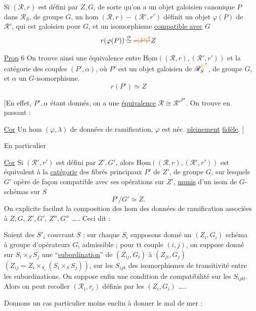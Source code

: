 Si $(\mathscr R,r)$ est défini par $Z,G$, de sorte qu'on a un objet galoisien canonique $P$ dans $\mathscr R_S$, de groupe $G$, un  hom $(\mathscr R,r)-(\mathscr R',r')$ définit un objet $\varphi(P)$ de $\mathscr R'$, qui est galoisien  pour $G$, et un isomorphisme \uline{compatible avec} $G$
\[
r(\varphi(P))\overset{\alpha}{\simeq}\deleted{\unsure{r(P)}} Z
\]

\uline{Prop} 6 On trouve ainsi une équivalence entre $\underline{\mathrm{Hom}}((\mathscr R,r),(\mathscr R',r'))$ et la catégorie des couples $(P',\alpha)$, où $P'$ est un objet galoisien de $\mathscr R^{\unsure{\prime|\,}}_S$, de groupe $G$, et $\alpha$ un $G$-isomorphisme.
\[
r(P')\simeq Z
\]

[En effet, $P',\alpha$ étant donnés, on a une \uline{équivalence} $\mathscr R\cong{\mathscr R'}^{P'}$. On trouve en passant  :

\uline{Cor}  Un hom $(\varphi,\lambda)$ de données de ramification,  $\varphi$ est néc. \uline{pleinement} \uline{fidèle}. ]

En particulier

\uline{Cor}  Si $(\mathscr R',r')$ est défini par $Z',G'$, alors $\underline{\mathrm{Hom}}((\mathscr R,r),(\mathscr R',r'))$ est équivalent à la \uline{catégorie} des fibrés principaux $P'$ de $Z'$, de groupe $G$, sur lesquels $G'$ opère  de façon compatible avec ses opérations sur $Z'$, \uline{munis} d'un isom de $G$-schémas sur $S$
\[
P'/G'\simeq Z.
\]
On explicite facilmt la composition des hom des données de ramification associées à $Z,G$, $Z',G'$, $Z'',G''$ \ldots.. Ceci dit :

Soient des $S'_i$ couvrant $S$ ; sur chaque $S_i$ supposons donné un $(Z_i,G_i)$ schéma à groupe d'opérateurs $G_i$ admissible ; pour tt couple $(i,j)$, on suppose donné  sur $S_i\times_S S_j$ une ``\uline{subordination}'' de $(Z_{ij},G_i)$ à $(Z_{ji},G_j)$ $(Z_{ij}=Z_i\times_{S_i}(S_i\times_S S_j))$,  sur les $S_{ijk}$ des isomorphismes de transitivité entre les subordinations. On suppose enfin une condition de compatibilité sur les $S_{ijkl}$. Alors on peut recoller  $(\mathscr R_i,r_i)$ définis par les $(Z_i,G_i)$ \ldots..

Donnons un cas particulier moins enclin à donner le mal de mer :

